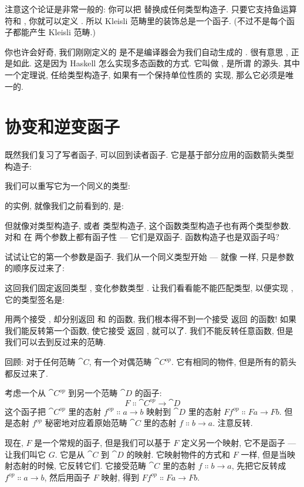 注意这个论证是非常一般的: 你可以把  替换成任何类型构造子. 只要它支持鱼运算符和 ,
你就可以定义 . 所以 Kleisli 范畴里的装饰总是一个函子. (不过不是每个函子都能产生 Kleisli 范畴.)

你也许会好奇, 我们刚刚定义的  是不是编译器会为我们自动生成的 . 很有意思
, 正是如此. 这是因为 Haskell 怎么实现多态函数的方式. 它叫做 
, 是所谓 的源头. 其中一个定理说, 任给类型构造子, 如果有一个保持单位性质的
 实现, 那么它必须是唯一的.

\section{协变和逆变函子}

既然我们复习了写者函子, 可以回到读者函子. 它是基于部分应用的函数箭头类型构造子:

我们可以重写它为一个同义的类型:

 的实例, 就像我们之前看到的, 是:

但就像对类型构造子, 或者  类型构造子, 这个函数类型构造子也有两个类型参数. 对和  在
两个参数上都有函子性 --- 它们是双函子. 函数构造子也是双函子吗?

试试让它的第一个参数是函子. 我们从一个同义类型开始 --- 就像  一样, 只是参数的顺序反过来了:

这回我们固定返回类型 , 变化参数类型 . 让我们看看能不能匹配类型, 以便实现 , 它的类型签名是:

用两个接受 , 却分别返回  和  的函数, 我们根本得不到一个接受  返回  的函数!
如果我们能反转第一个函数, 使它接受  返回 , 就可以了. 我们不能反转任意函数, 但是我们可以去到反过来的范畴.

回顾: 对于任何范畴 $\cat{C}$, 有一个对偶范畴 $\cat{C}^{op}$. 它有相同的物件, 但是所有的箭头都反过来了.

考虑一个从 $\cat{C}^{op}$ 到另一个范畴 $\cat{D}$ 的函子:
\[F \Colon \cat{C}^{op} \to \cat{D}\]
这个函子把 $\cat{C}^{op}$ 里的态射 $f^{op} \Colon a \to b$ 映射到 $\cat{D}$ 里的态射 $F f^{op} \Colon F a \to F b$.
但是态射 $f^{op}$ 秘密地对应着原始范畴 $\cat{C}$ 里的态射 $f \Colon b \to a$. 注意反转.

现在, $F$ 是一个常规的函子, 但是我们可以基于 $F$ 定义另一个映射, 它不是函子 --- 让我们叫它 $G$. 它是从 $\cat{C}$ 到
$\cat{D}$ 的映射. 它映射物件的方式和 $F$ 一样, 但是当映射态射的时候, 它反转它们. 它接受范畴 $\cat{C}$ 里的态射
$f \Colon b \to a$, 先把它反转成 $f^{op} \Colon a \to b$, 然后用函子 $F$ 映射, 得到 $F f^{op} \Colon F a \to F b$.

